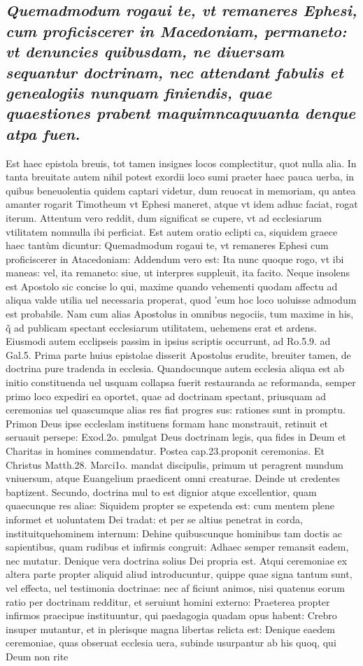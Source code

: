 \documentclass{article}
\begin{document}
\begin{pages}
\subsection*{\textit{Quemadmodum rogaui te, vt remaneres Ephesi, cum proficiscerer in Macedoniam, permaneto: vt denuncies quibusdam, ne diuersam sequantur doctrinam, nec attendant fabulis et genealogiis nunquam finiendis, quae quaestiones prabent maquimncaquuanta denque atpa fuen. }}\pstart Est haec epistola breuis, tot tamen insignes locos complectitur, quot nulla alia. In tanta breuitate autem nihil potest exordii loco sumi praeter haec pauca uerba, in quibus beneuolentia quidem captari videtur, dum reuocat in memoriam, qu antea amanter rogarit Timotheum vt Ephesi maneret, atque  vt idem adhuc faciat, rogat iterum. Attentum vero reddit, dum significat se cupere, vt ad ecclesiarum vtilitatem nomnulla ibi perficiat. Est autem oratio eclipti ca, siquidem graece haec tantùm dicuntur: Quemadmodum rogaui te, vt remaneres Ephesi cum proficiscerer in Atacedoniam: Addendum vero est: Ita nunc quoque  rogo, vt ibi maneas: vel, ita remaneto: siue, ut interpres suppleuit, ita facito. Neque  insolens est Apostolo sic concise lo qui, maxime quando vehementi quodam affectu ad aliqua valde utilia uel necessaria properat, quod 'eum hoc loco uoluisse admodum est probabile. Nam cum alias Apostolus in omnibus negociis, tum maxime in his, q̃ ad publicam spectant ecclesiarum utilitatem, uehemens erat et ardens. Eiusmodi autem ecclipseis passim in ipsius scriptis occurrunt, ad Ro.5.9. ad Gal.5.  \pend\pstart Prima parte huius epistolae disserit Apostolus erudite, breuiter tamen, de doctrina pure tradenda in ecclesia. Quandocunque  autem ecclesia aliqua est ab initio constituenda uel usquam collapsa fuerit restauranda ac reformanda, semper primo loco expediri ea oportet, quae ad doctrinam spectant, priusquam ad ceremonias uel quascumque  alias res fiat progres sus: rationes sunt in promptu. Primon Deus ipse eccleslam instituens formam hanc monstrauit, retinuit et seruauit persepe: Exod.2o. pmulgat Deus doctrinam legis, qua fides in Deum et Charitas in homines commendatur. Postea cap.23.proponit ceremonias. Et Christus Matth.28. Marci1o. mandat discipulis, primum ut peragrent mundum vniuersum, atque  Euangelium praedicent omni creaturae. Deinde ut credentes baptizent. Secundo, doctrina mul to est dignior atque  excellentior, quam quaecunque  res aliae: Siquidem propter se expetenda est: cum mentem plene informet et uoluntatem Dei tradat: et per se altius penetrat in corda, instituitquehominem internum: Dehine quibuscunque  hominibus tam doctis ac sapientibus, quam rudibus et infirmis congruit: Adhaec semper remansit eadem, nec mutatur. Denique  vera doctrina solius Dei propria est. Atqui ceremoniae ex altera parte propter aliquid aliud introducuntur, quippe quae signa tantum sunt, vel effecta, uel testimonia doctrinae: nec af ficiunt animos, nisi quatenus eorum ratio per doctrinam redditur, et seruiunt homini externo: Praeterea propter infirmos praecipue instituuntur, qui paedagogia quadam opus habent: Crebro insuper mutantur, et in plerisque  magna libertas relicta est: Denique  eaedem ceremoniae, quas obseruat ecclesia uera, subinde usurpantur ab his quoq, qui Deum non rite 
\end{pages}
\end{document}
